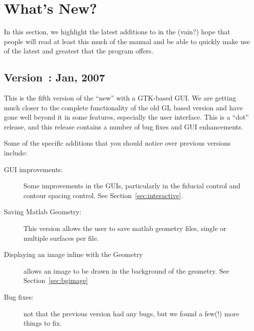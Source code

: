 \section{What's New?}
\label{sec:new-features} 

In this section, we highlight the latest additions to \map{} in the
(vain?) hope that people will read at least this much of the manual
and be able to quickly make use of the latest and greatest that the program
offers.

\subsection{Version~\version{}: Jan, 2007}

This is the fifth version of the ``new'' \map{} with a GTK-based GUI.  We
are getting much closer to the complete functionality of the old GL
based version and have gone well beyond it in some features, especially the
user interface.  This is a ``dot'' release, and this release contains
a number of bug fixes and GUI enhancements.

Some of the specific additions that you should notice over previous versions
include:
%
\begin{description}
  \item [GUI improvements: ] Some improvements in the GUIs, particularly in the
    fiducial control and contour spacing control.  See 
    Section~\ref{sec:interactive}.
  \item [Saving Matlab Geometry: ] This version allows the user to save matlab 
    geometry files, single or multiple surfaces per file.
  \item [Displaying an image inline with the Geometry] \map{} allows an image to be
    drawn in the background of the geometry.  See Section~\ref{sec:bgimage}
  \item [Bug fixes: ] not that the previous version had any bugs, but we
    found a few(!) more things to fix.
\end{description}

